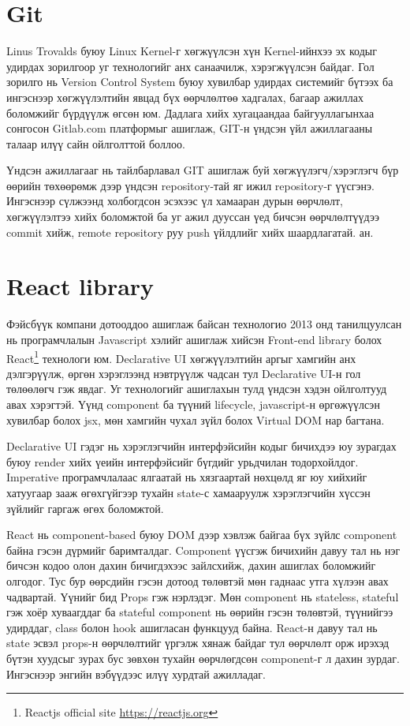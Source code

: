 
\section{Git}
Linus Trovalds буюу Linux Kernel-г хөгжүүлсэн хүн Kernel-ийнхээ эх кодыг удирдах зорилгоор уг технологийг анх санаачилж, хэрэгжүүлсэн байдаг. Гол зорилго нь Version Control System буюу хувилбар удирдах системийг бүтээх ба ингэснээр хөгжүүлэлтийн явцад бүх өөрчлөлтөө хадгалах, багаар ажиллах боломжийг бүрдүүлж өгсөн юм. Дадлага хийх хугацаандаа байгууллагынхаа сонгосон Gitlab.com платформыг ашиглаж, GIT-н үндсэн үйл ажиллагааны талаар илүү сайн ойлголттой боллоо. 

Үндсэн ажиллагааг нь тайлбарлавал GIT ашиглаж буй хөгжүүлэгч/хэрэглэгч бүр өөрийн төхөөрөмж дээр үндсэн repository-тай яг ижил repository-г үүсгэнэ. Ингэснээр сүлжээнд холбогдсон эсэхээс үл хамааран дурын өөрчлөлт, хөгжүүлэлтээ хийх боломжтой ба уг ажил дууссан үед бичсэн өөрчлөлтүүдээ commit хийж, remote repository руу push үйлдлийг хийх шаардлагатай. ан.

\section{React library}
Фэйсбүүк компани дотооддоо ашиглаж байсан технологио 2013 онд танилцуулсан нь програмчлалын Javascript хэлийг ашиглаж хийсэн Front-end library болох React\footnote{Reactjs official site \url{https://reactjs.org}} технологи юм. Declarative UI хөгжүүлэлтийн аргыг хамгийн анх дэлгэрүүлж, өргөн хэрэглээнд нэвтрүүлж чадсан тул Declarative UI-н гол төлөөлөгч гэж явдаг. Уг технологийг ашиглахын тулд үндсэн хэдэн ойлголтууд авах хэрэгтэй. Үүнд component ба түүний lifecycle, javascript-н өргөжүүлсэн хувилбар болох jsx, мөн хамгийн чухал зүйл болох Virtual DOM нар багтана. 

Declarative UI гэдэг нь хэрэглэгчийн интерфэйсийн кодыг бичихдээ юу зурагдах буюу render хийх үеийн интерфэйсийг бүгдийг урьдчилан тодорхойлдог. Imperative програмчлалаас ялгаатай нь хязгаартай нөхцөлд яг юу хийхийг хатуугаар зааж өгөхгүйгээр тухайн state-с хамааруулж хэрэглэгчийн хүссэн зүйлийг гаргаж өгөх боломжтой.   

React нь component-based буюу DOM дээр хэвлэж байгаа бүх зүйлс component байна гэсэн дүрмийг баримталдаг. Component үүсгэж бичихийн давуу тал нь нэг бичсэн кодоо олон дахин бичигдэхээс зайлсхийж, дахин ашиглах боломжийг олгодог. Тус бур өөрсдийн гэсэн дотоод төлөвтэй мөн гаднаас утга хүлээн авах чадвартай. Үүнийг бид Props гэж нэрлэдэг. Мөн component нь stateless, stateful гэж хоёр хуваагддаг ба stateful component нь өөрийн гэсэн төлөвтэй, түүнийгээ удирддаг, class болон hook ашигласан функцууд байна. React-н давуу тал нь state эсвэл props-н өөрчлөлтийг үргэлж хянаж байдаг тул өөрчлөлт орж ирэхэд бүтэн хуудсыг зурах бус зөвхөн тухайн өөрчлөгдсөн component-г л дахин зурдаг. Ингэснээр энгийн вэбүүдээс илүү хурдтай ажилладаг.


